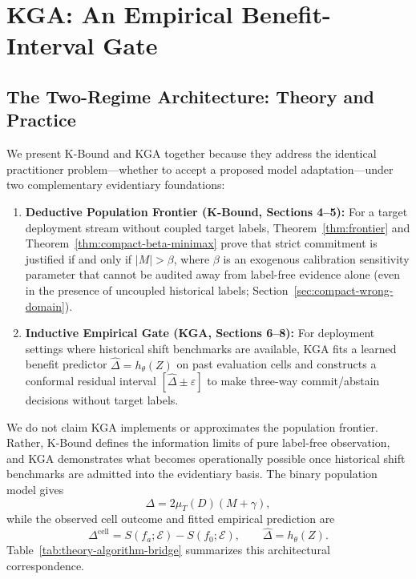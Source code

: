\section{KGA: An Empirical Benefit-Interval Gate}
\label{sec:compact-kga}

\subsection{The Two-Regime Architecture: Theory and Practice}
\label{sec:compact-bridge}

We present K-Bound and KGA together because they address the identical practitioner problem---whether
to accept a proposed model adaptation---under two complementary evidentiary foundations:
\begin{enumerate}
  \item \textbf{Deductive Population Frontier (K-Bound, Sections 4--5):} For a target deployment
  stream without coupled target labels, Theorem~\ref{thm:frontier} and
  Theorem~\ref{thm:compact-beta-minimax} prove that strict commitment is justified if and only if
  $|M| > \beta$, where $\beta$ is an exogenous calibration sensitivity parameter that cannot be
  audited away from label-free evidence alone (even in the presence of uncoupled historical labels;
  Section~\ref{sec:compact-wrong-domain}).
  \item \textbf{Inductive Empirical Gate (KGA, Sections 6--8):} For deployment settings where
  historical shift benchmarks are available, KGA fits a learned benefit predictor $\widehat\Delta=h_\theta(Z)$
  on past evaluation cells and constructs a conformal residual interval $[\widehat\Delta \pm \varepsilon]$
  to make three-way commit/abstain decisions without target labels.
\end{enumerate}
We do not claim KGA implements or approximates the population frontier. Rather, K-Bound defines the
information limits of pure label-free observation, and KGA demonstrates what becomes operationally
possible once historical shift benchmarks are admitted into the evidentiary basis.
The binary population model gives
\begin{equation}
 \Delta=2\mu_T(D)(M+\gamma),
\label{eq:compact-bridge}
\end{equation}
while the observed cell outcome and fitted empirical prediction are
\begin{equation}
 \Delta^{\mathrm{cell}}=S(f_a;\mathcal E)-S(f_0;\mathcal E), \qquad \widehat\Delta=h_\theta(Z).
\end{equation}
Table~\ref{tab:theory-algorithm-bridge} summarizes this architectural correspondence.

